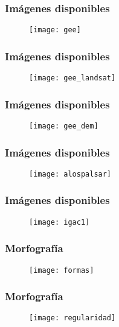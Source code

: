 \documentclass{beamer}
\begin{document}
\begin{frame}
\frametitle{Imágenes disponibles} 
 \begin{figure}
    \centering
    \texttt{[image: gee]}
  \end{figure}
\end{frame}
\begin{frame}
\frametitle{Imágenes disponibles} 
 \begin{figure}
    \centering
    \texttt{[image: gee\_landsat]}
  \end{figure}
\end{frame}
\begin{frame}
\frametitle{Imágenes disponibles} 
 \begin{figure}
    \centering
    \texttt{[image: gee\_dem]}
  \end{figure}
\end{frame}
\begin{frame}
\frametitle{Imágenes disponibles} 
 \begin{figure}
    \centering
    \texttt{[image: alospalsar]}
  \end{figure}
\end{frame}
\begin{frame}
\frametitle{Imágenes disponibles} 
 \begin{figure}
    \centering
    \texttt{[image: igac1]}
  \end{figure}
\end{frame}
\begin{frame}
\frametitle{Morfografía} 
 \begin{figure}
    \centering
    \texttt{[image: formas]}
  \end{figure}
\end{frame}
\begin{frame}
\frametitle{Morfografía} 
 \begin{figure}
    \centering
    \texttt{[image: regularidad]}
  \end{figure}
\end{frame}
\end{document}
